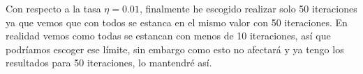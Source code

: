 \documentclass[12pt, spanish]{article}
\begin{document}
Con respecto a la tasa $\eta = 0.01$, finalmente he escogido realizar solo 50 iteraciones ya que vemos que con todos se estanca en el mismo valor con 50 iteraciones. En realidad vemos como todas se estancan con menos de 10 iteraciones, así que podríamos escoger ese límite, sin embargo como esto no afectará y ya tengo los resultados para 50 iteraciones, lo mantendré así.

\begin{table}[H]
\small
{}
\end{table}
\end{document}

